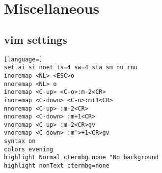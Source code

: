 \documentclass{article}
\begin{document}
\section{Miscellaneous}
\subsection{vim settings}
\begin{lstlisting}[language=]
set ai si noet ts=4 sw=4 sta sm nu rnu
inoremap <NL> <ESC>o
nnoremap <NL> o
inoremap <C-up> <C-o>:m-2<CR>
inoremap <C-down> <C-o>:m+1<CR>
nnoremap <C-up> :m-2<CR>
nnoremap <C-down> :m+1<CR>
vnoremap <C-up> :m-2<CR>gv
vnoremap <C-down> :m'>+1<CR>gv
syntax on
colors evening
highlight Normal ctermbg=none "No background
highlight nonText ctermbg=none
\end{lstlisting}
\end{document}
